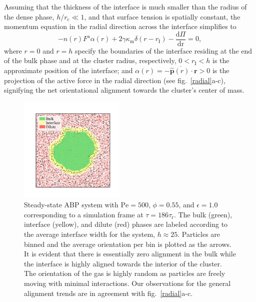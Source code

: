 \documentclass[twoside,twocolumn,9pt]{article}
\begin{document}

Assuming that the thickness of the interface is much smaller than the radius of the dense phase, $h/r_\text{c}\ll 1$, and that surface tension is spatially constant, the momentum equation in the radial direction across the interface simplifies to 
\begin{equation}
    -n(r)F^\text{a}\alpha(r)+2\gamma \kappa_\text{m} \delta(r-r_\text{I}) -\frac{\mathrm{d}\Pi}{\mathrm{dr}}=0,
    \label{eq:bl1}
\end{equation}
where $r=0$ and $r=h$ specify the boundaries of the interface residing at the end of the bulk phase and at the cluster radius, respectively, $0<r_\text{I}<h$ is the approximate position of the interface; and $\alpha(r)=\overline{-\hat{\mathbf{p}}(r)\cdot \mathbf{r}}>0$ is the projection of the active force in the radial direction (see fig.~\ref{radial}a-c), signifying the net orientational alignment towards the cluster's center of mass. 

\begin{figure}[ht!]
\centering
  \includegraphics[width=0.45\textwidth, trim={1.8cm 1.6cm 1.5cm 1.8cm},clip]{figure_6.png}
  \caption{Steady-state ABP system with $\mathrm{Pe}=500$, $\phi=0.55$, and $\epsilon=1.0$ corresponding to a simulation frame at $\tau=186\tau_\text{r}$. The bulk (green), interface (yellow), and dilute (red) phases are labeled according to the average interface width for the system, $h\approx25$. Particles are binned and the average orientation per bin is plotted as the arrows. It is evident that there is essentially zero alignment in the bulk while the interface is highly aligned towards the interior of the cluster.  The orientation of the gas is highly random as particles are freely moving with minimal interactions.  Our observations for the general alignment trends are in agreement with fig.~\ref{radial}a-c.}
  \label{surfacetense}
\end{figure}
\end{document}
